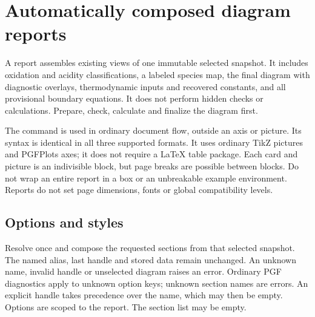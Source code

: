 \documentclass[a4paper,11pt]{ltxdoc}
\begin{document}
\section{Automatically composed diagram reports}
\label{sec:reports}
A report assembles existing views of one immutable selected snapshot. It includes
oxidation and acidity classifications, a labeled species map, the final diagram
with diagnostic overlays, thermodynamic inputs and recovered constants, and all
provisional boundary equations. It does not perform hidden checks or calculations.
Prepare, check, calculate and finalize the diagram first.

\begin{codeexample}
\begingroup
{}
\endgroup
\end{codeexample}
The command is used in ordinary document flow, outside an axis or picture. Its
syntax is identical in all three supported formats. It uses ordinary TikZ pictures
and PGFPlots axes; it does not require a LaTeX table package. Each card and picture
is an indivisible block, but page breaks are possible between blocks. Do not wrap
an entire report in a box or an unbreakable example environment. Reports do not
set page dimensions, fonts or global compatibility levels.

\subsection{Options and styles}
\begin{command}{\pgfplotspourbaixreport{}}
Resolve  once and compose the requested sections from that selected
snapshot. The named alias, last handle and stored data remain unchanged.
An unknown name, invalid handle or unselected diagram raises an error. Ordinary
PGF diagnostics apply to unknown option keys; unknown section names are errors.
An explicit handle takes precedence over the name, which may then be empty.
Options are scoped to the report. The section list may be empty.
\end{command}
\end{document}
